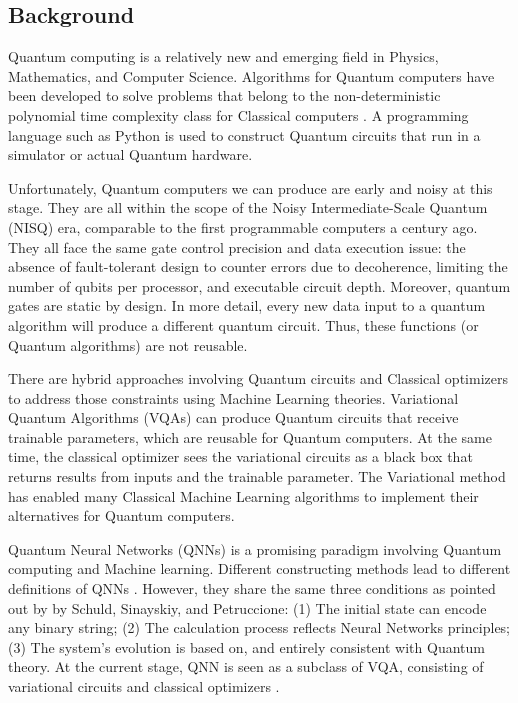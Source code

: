 \subsection{Background}\label{Background Section}
Quantum computing is a relatively new and emerging field in Physics, Mathematics, and Computer Science. 
Algorithms for Quantum computers have been developed to solve problems that belong to the non-deterministic polynomial time complexity class for Classical computers \cite{williamsSolvingNPCompleteProblems2011,jiangQuantumAnnealingPrime2018,farhiQuantumApproximateOptimization2014}. 
A programming language such as Python is used to construct Quantum circuits that run in a simulator or actual Quantum hardware. 

Unfortunately, Quantum computers we can produce are early and noisy at this stage. 
They are all within the scope of the Noisy Intermediate-Scale Quantum (NISQ) \cite{brooksQuantumSupremacyHunt2019} era, comparable to the first programmable computers a century ago. 
They all face the same gate control precision and data execution issue: the absence of fault-tolerant design to counter errors due to decoherence, limiting the number of qubits per processor, and executable circuit depth. 
Moreover, quantum gates are static by design. 
In more detail, every new data input to a quantum algorithm will produce a different quantum circuit. 
Thus, these functions (or Quantum algorithms) are not reusable.

There are hybrid approaches involving Quantum circuits and Classical optimizers to address those constraints using Machine Learning theories. 
Variational Quantum Algorithms (VQAs) \cite{cerezo2021variational} can produce Quantum circuits that receive trainable parameters, which are reusable for Quantum computers. 
At the same time, the classical optimizer sees the variational circuits as a black box that returns results from inputs and the trainable parameter. 
The Variational method has enabled many Classical Machine Learning algorithms to implement their alternatives for Quantum computers.

Quantum Neural Networks (QNNs) \cite{altaisky2001quantum} is a promising paradigm involving Quantum computing and Machine learning. 
Different constructing methods lead to different definitions of QNNs \cite{paetznick2013} \cite{zhaoBuildingQuantumNeural2019} \cite{caoQuantumNeuronElementary2017}. 
However, they share the same three conditions as pointed out by \cite{schuldQuestQuantumNeural2014} by Schuld, Sinayskiy, and Petruccione: 
(1) The initial state can encode any binary string;
(2) The calculation process reflects Neural Networks principles;
(3) The system's evolution is based on, and entirely consistent with Quantum theory.
At the current stage, QNN is seen as a subclass of VQA, consisting of variational circuits and classical optimizers \cite{abbasPowerQuantumNeural2021}.

